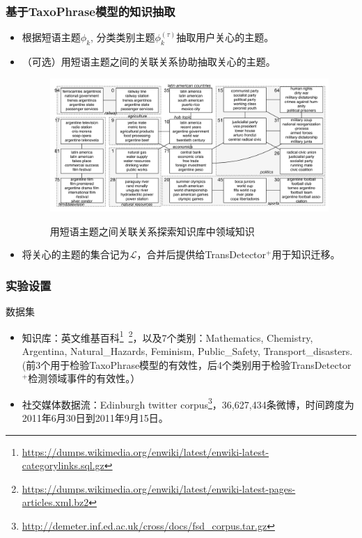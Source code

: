 \begin{frame}
\frametitle{\noindent 基于TaxoPhrase模型的知识抽取}
\vspace{-0.5cm}
\begin{itemize}
	\item 根据短语主题\(\phi_k\), 分类类别主题\(\phi_k^{(\tau)}\)抽取用户关心的主题。
	\item （可选）用短语主题之间的关联关系协助抽取关心的主题。
\vspace{-0.5cm}
\begin{figure}
	\centering
	\caption{用短语主题之间关联关系探索知识库中领域知识}
    \includegraphics[width=0.75\columnwidth]{img/TD+/PhraseCTM_result}
	\label{fig:IllustrationTaxoPhrase}
\end{figure}

	\item 将关心的主题的集合记为\(\mathcal{L}\)，合并后提供给TransDetector$^+$用于知识迁移。
\end{itemize}

\end{frame}



\begin{frame}
\frametitle{\noindent 实验设置}
\noindent 数据集
\begin{itemize}
	\item 知识库：英文维基百科\footnote{\tiny{\url{https://dumps.wikimedia.org/enwiki/latest/enwiki-latest-categorylinks.sql.gz}}}\ \footnote{\tiny{\url{https://dumps.wikimedia.org/enwiki/latest/enwiki-latest-pages-articles.xml.bz2}}}，以及7个类别：Mathematics, Chemistry, Argentina, Natural\_Hazards, Feminism, Public\_Safety, Transport\_disasters. (前3个用于检验TaxoPhrase模型的有效性，后4个类别用于检验TransDetector$^+$检测领域事件的有效性。）
	\item 社交媒体数据流：Edinburgh twitter corpus\footnote{\tiny{\url{http://demeter.inf.ed.ac.uk/cross/docs/fsd_corpus.tar.gz}}}，36,627,434条微博，时间跨度为2011年6月30日到2011年9月15日。
\end{itemize} 
\end{frame}

